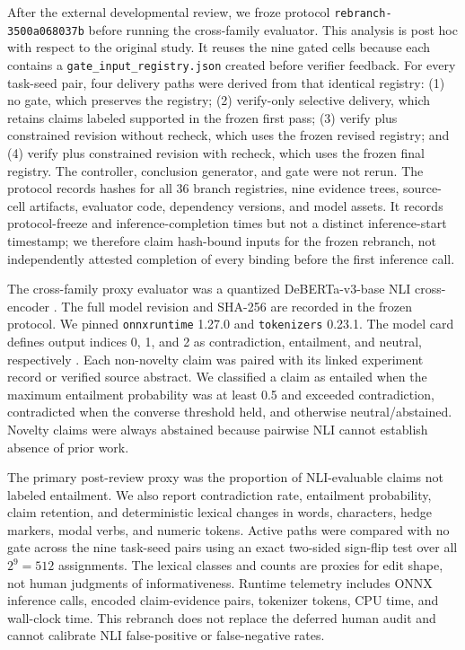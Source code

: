 \documentclass[11pt]{article}
\begin{document}
After the external developmental review, we froze protocol \texttt{rebranch-3500a068037b} before running the cross-family evaluator. This analysis is post hoc with respect to the original study. It reuses the nine gated cells because each contains a \texttt{gate\_input\_registry.json} created before verifier feedback. For every task-seed pair, four delivery paths were derived from that identical registry: (1) no gate, which preserves the registry; (2) verify-only selective delivery, which retains claims labeled supported in the frozen first pass; (3) verify plus constrained revision without recheck, which uses the frozen revised registry; and (4) verify plus constrained revision with recheck, which uses the frozen final registry. The controller, conclusion generator, and gate were not rerun. The protocol records hashes for all 36 branch registries, nine evidence trees, source-cell artifacts, evaluator code, dependency versions, and model assets. It records protocol-freeze and inference-completion times but not a distinct inference-start timestamp; we therefore claim hash-bound inputs for the frozen rebranch, not independently attested completion of every binding before the first inference call.

The cross-family proxy evaluator was a quantized DeBERTa-v3-base NLI cross-encoder \cite{debertav3,debertanli}. The full model revision and SHA-256 are recorded in the frozen protocol. We pinned \texttt{onnxruntime} 1.27.0 and \texttt{tokenizers} 0.23.1. The model card defines output indices 0, 1, and 2 as contradiction, entailment, and neutral, respectively \cite{debertanli}. Each non-novelty claim was paired with its linked experiment record or verified source abstract. We classified a claim as entailed when the maximum entailment probability was at least 0.5 and exceeded contradiction, contradicted when the converse threshold held, and otherwise neutral/abstained. Novelty claims were always abstained because pairwise NLI cannot establish absence of prior work.

The primary post-review proxy was the proportion of NLI-evaluable claims not labeled entailment. We also report contradiction rate, entailment probability, claim retention, and deterministic lexical changes in words, characters, hedge markers, modal verbs, and numeric tokens. Active paths were compared with no gate across the nine task-seed pairs using an exact two-sided sign-flip test over all $2^9=512$ assignments. The lexical classes and counts are proxies for edit shape, not human judgments of informativeness. Runtime telemetry includes ONNX inference calls, encoded claim-evidence pairs, tokenizer tokens, CPU time, and wall-clock time. This rebranch does not replace the deferred human audit and cannot calibrate NLI false-positive or false-negative rates.
\end{document}
